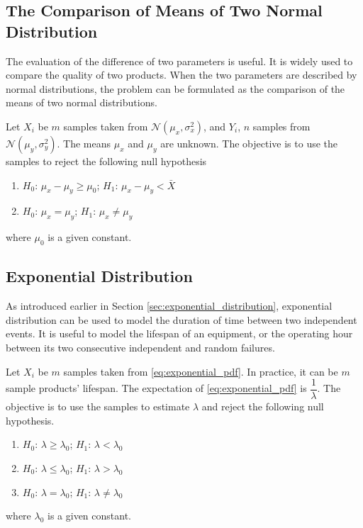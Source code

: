 \subsection{The Comparison of Means of Two Normal Distribution}

The evaluation of the difference of two parameters is useful. It is widely used to compare the quality of two products. When the two parameters are described by normal distributions, the problem can be formulated as the comparison of the means of two normal distributions.

Let $X_i$ be $m$ samples taken from $\mathcal{N}(\mu_x, \sigma_x^2)$, and $Y_i$, $n$ samples from $\mathcal{N}(\mu_y, \sigma_y^2)$. The means $\mu_x$ and $\mu_y$ are unknown. The objective is to use the samples to reject the following null hypothesis
\begin{enumerate}
	\item $H_0$: $\mu_x - \mu_y \geq \mu_0$; $H_1$: $\mu_x - \mu_y < \bar{X}$
	\item $H_0$: $\mu_x = \mu_y$; $H_1$: $\mu_x \neq \mu_y$
\end{enumerate} 
where $\mu_0$ is a given constant.

\subsection{Exponential Distribution}

As introduced earlier in Section \ref{sec:exponential_distribution}, exponential distribution can be used to model the duration of time between two independent events. It is useful to model the lifespan of an equipment, or the operating hour between its two consecutive independent and random failures.

Let $X_i$ be $m$ samples taken from \eqref{eq:exponential_pdf}. In practice, it can be $m$ sample products' lifespan. The expectation of \eqref{eq:exponential_pdf} is $\dfrac{1}{\lambda}$. The objective is to use the samples to estimate $\lambda$ and reject the following null hypothesis.
\begin{enumerate}
	\item $H_0$: $\lambda \geq \lambda_0$; $H_1$: $\lambda < \lambda_0$
	\item $H_0$: $\lambda \leq \lambda_0$; $H_1$: $\lambda > \lambda_0$
	\item $H_0$: $\lambda = \lambda_0$; $H_1$: $\lambda \neq \lambda_0$
\end{enumerate}
where $\lambda_0$ is a given constant.

